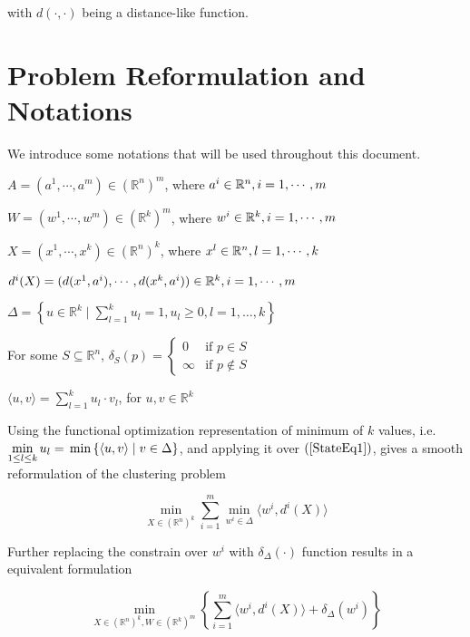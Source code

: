 \documentclass[11pt]{article}
\numberwithin{equation}{section}
\begin{document}
\noindent with $\textit{d}(\cdot ,\cdot)$ being a distance-like function.

\section{Problem Reformulation and Notations}

We introduce some notations that will be used throughout this document.

\noindent $A = (a^1, \cdots , a^m) \in \left(\mathbb{R}^n\right)^m$, where $a^i \in \mathbb{R}^n,\smallskip i=1, \cdots , m$

\noindent $W = (w^1, \cdots , w^m) \in \left(\mathbb{R}^k\right)^m$, where $w^i \in \mathbb{R}^k,\smallskip i=1, \cdots , m$

\noindent $X = (x^1, \cdots , x^k) \in \left(\mathbb{R}^n\right)^k$, where $x^l \in \mathbb{R}^n,\smallskip l=1, \cdots , k$

\noindent $d^{i}(X) = (d(x^1,a^i), \cdots , d(x^k,a^i)) \in \mathbb{R}^k,\smallskip i=1, \cdots , m$

\noindent $\Delta = \left\lbrace u \in \mathbb{R}^k \mid \sum\limits_{l=1}^{k} u_l = 1, u_l \geq 0 , l=1, \dots ,k \right\rbrace$

\noindent For some $S \subseteq \mathbb{R}^n$, $\delta_S(p) = \begin{cases} 0 &\mbox{if } p \in S \\ 
\infty &\mbox{if } p \not\in S \end{cases}$

\noindent $\langle u,v \rangle = \sum\limits_{l=1}^{k} u_l \cdot v_l$, for $u,v \in \mathbb{R}^k$

Using the functional optimization representation of minimum of $k$ values, i.e. $\min\limits_{1 \leq l \leq k} u_l = \newline \min \left\lbrace \langle u,v \rangle \mid v \in \Delta \right\rbrace$, and applying it over $\left(\ref{StateEq1}\right)$, gives a smooth reformulation of the clustering problem

\begin{equation}
	\min\limits_{X \in \left(\mathbb{R}^n\right)^k} \sum\limits_{i=1}^{m} \min\limits_{w^i \in \Delta} \langle w^i , d^i(X) \rangle \label{StateEq2}
\end{equation}

Further replacing the constrain over $w^i$ with $\delta_{\Delta}(\cdot)$ function results in a equivalent formulation

\begin{equation}
	\min\limits_{X \in \left(\mathbb{R}^n\right)^k , W \in \left(\mathbb{R}^k\right)^m} \left\lbrace \sum\limits_{i=1}^{m} \langle w^i , d^i(X) \rangle + \delta_{\Delta}(w^i) \right\rbrace \label{StateEq3}
\end{equation}
\end{document}
